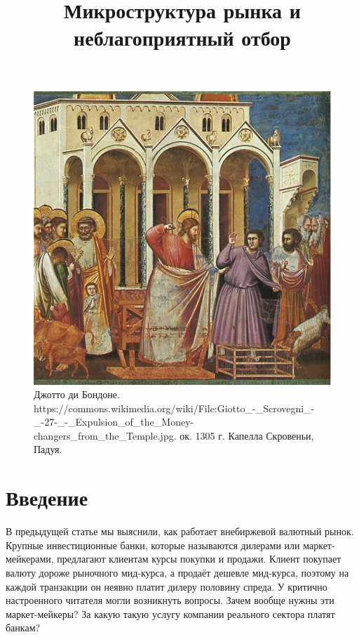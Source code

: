 
\title{Микроструктура рынка и неблагоприятный отбор}



\maketitle
\thispagestyle{empty}

\begin{figure}[h]
\centering
\includegraphics[scale=0.63]{temple.jpg}
\captionsetup{labelformat=empty}
\caption{\small{
Джотто ди Бондоне. 
{https://commons.wikimedia.org/wiki/File:Giotto_-_Scrovegni_-_-27-_-_Expulsion_of_the_Money-changers_from_the_Temple.jpg}.
ок. 1305 г. Капелла Скровеньи, Падуя.
}}
\end{figure}
\newpage

\section*{Введение}

В предыдущей статье мы выяснили, как работает внебиржевой валютный рынок.
Крупные инвестиционные банки, которые называются дилерами или маркет-мейкерами,
предлагают клиентам курсы покупки и продажи. Клиент покупает валюту дороже
рыночного мид-курса, а продаёт дешевле мид-курса, поэтому на каждой транзакции
он неявно платит дилеру половину спреда. У критично настроенного читателя могли
возникнуть вопросы. Зачем вообще нужны эти маркет-мейкеры? За какую такую услугу
компании реального сектора платят банкам?


